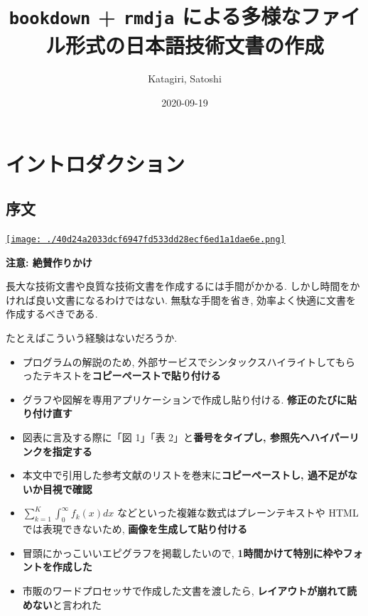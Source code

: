 \documentclass[
  nomag]{bxjsbook}
\title{\texttt{bookdown} + \texttt{rmdja}
による多様なファイル形式の日本語技術文書の作成}
\author{Katagiri, Satoshi}
\date{2020-09-19}
\providecommand{\tightlist}{%
  \setlength{\itemsep}{0pt}\setlength{\parskip}{0pt}}
\theoremstyle{definition}
\theoremstyle{definition}
\theoremstyle{definition}
\theoremstyle{remark}
\begin{document}
\maketitle

\makeatletter
\def\emptypage@emptypage{%
    \hbox{}%
    \thispagestyle{headings}%
    \newpage%
}%
\def\cleardoublepage{%
        \clearpage%
        \if@twoside%
            \ifodd\c@page%
            \else%
                \emptypage@emptypage%
            \fi%
        \fi%
    }%
\makeatother

{
\hypersetup{linkcolor=}
\setcounter{tocdepth}{2}
\tableofcontents
}
\hypertarget{part-ux30a4ux30f3ux30c8ux30edux30c0ux30afux30b7ux30e7ux30f3}{%
\part{
イントロダクション}\label{part-ux30a4ux30f3ux30c8ux30edux30c0ux30afux30b7ux30e7ux30f3}}

\hypertarget{ux5e8fux6587}{%
\chapter*{序文}\label{ux5e8fux6587}}

\href{https://creativecommons.org/licenses/by-nc/4.0/deed.ja}{\texttt{[image: ./40d24a2033dcf6947fd533dd28ecf6ed1a1dae6e.png]}}

\textbf{注意: 絶賛作りかけ}

長大な技術文書や良質な技術文書を作成するには手間がかかる.
しかし時間をかければ良い文書になるわけではない. 無駄な手間を省き,
効率よく快適に文書を作成するべきである.

たとえばこういう経験はないだろうか.

\begin{itemize}
\tightlist
\item
  プログラムの解説のため,
  外部サービスでシンタックスハイライトしてもらったテキストを\textbf{コピーペーストで貼り付ける}
\item
  グラフや図解を専用アプリケーションで作成し貼り付ける.
  \textbf{修正のたびに貼り付け直す}
\item
  図表に言及する際に「図 1」「表 2」と\textbf{番号をタイプし,
  参照先へハイパーリンクを指定する}
\item
  本文中で引用した参考文献のリストを巻末に\textbf{コピーペーストし,
  過不足がないか目視で確認}
\item
  \(\sum_{k=1}^K\int_0^\infty f_k(x) dx\)
  などといった複雑な数式はプレーンテキストや HTML では表現できないため,
  \textbf{画像を生成して貼り付ける}
\item
  冒頭にかっこいいエピグラフを掲載したいので,
  \textbf{1時間かけて特別に枠やフォントを作成した}
\item
  市販のワードプロセッサで作成した文書を渡したら,
  \textbf{レイアウトが崩れて読めない}と言われた
\end{itemize}
\end{document}
